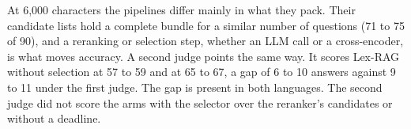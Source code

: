 At 6,000 characters the pipelines differ mainly in what they pack. Their candidate lists hold a complete bundle for a similar number of questions (71 to 75 of 90), and a reranking or selection step, whether an LLM call or a cross-encoder, is what moves accuracy. A second judge points the same way. It scores Lex-RAG without selection at 57 to 59 and \lexb{} at 65 to 67, a gap of 6 to 10 answers against 9 to 11 under the first judge. The gap is present in both languages. The second judge did not score the arms with the selector over the reranker's candidates or without a deadline.
